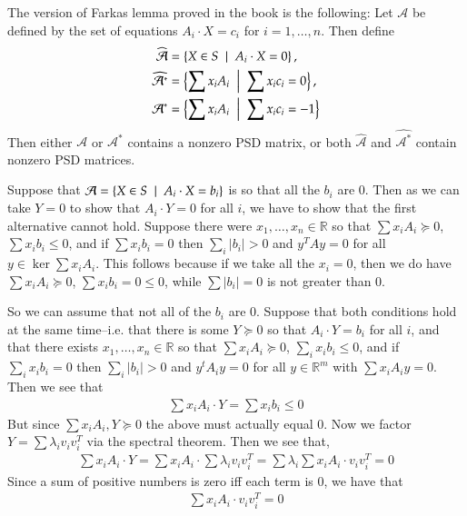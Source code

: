 \documentclass[12pt]{article}
\theoremstyle{definitionstyle}
\def\mbb#1{\mathbb{#1}}
\def\R{\mbb{R}}
\newcommand{\SET}[1]{\Set{\mskip-\medmuskip #1 \mskip-\medmuskip}}
\begin{document}
    The version of Farkas lemma proved in the book is the following:
    Let $\mathcal A$ be defined by the set of equations $A_i \cdot X = c_i$ for $i = 1,\ldots,n$. Then define
    \begin{align*}
        \widehat{\mathcal A} &= \SET{X \in S \; | \; A_i \cdot X = 0}, \\
        \widehat{\mathcal A^*} &= \SET{\sum x_iA_i \; | \; \sum x_ic_i = 0}, \\
        \mathcal A^* &= \SET{\sum x_iA_i \; | \; \sum x_ic_i = -1}
    \end{align*}
    Then either $\mathcal A$ or $\mathcal A^*$ contains a nonzero PSD matrix, or both $\widehat{\mathcal A}$ and $\widehat{\mathcal A^*}$ contain nonzero PSD matrices.

    Suppose that $\mathcal{A} = \SET{X \in S \; | \; A_i \cdot X = b_i}$ is so that all the $b_i$ are 0. Then as we can take $Y=0$ to show that $A_i \cdot Y = 0$ for all $i$, we have to show that the first alternative cannot hold. Suppose there were $x_1, \ldots, x_n \in \R$ so that $\sum x_i A_i \succeq 0$, $\sum x_ib_i \leq 0$, and if $\sum x_ib_i = 0$ then $\sum_i |b_i| > 0$ and $y^TAy = 0$ for all $y \in \ker \sum x_iA_i$. This follows because if we take all the $x_i = 0$, then we do have $\sum x_iA_i \succeq 0$, $\sum x_ib_i = 0 \leq 0$, while $\sum |b_i| = 0$ is not greater than 0. 
    
    So we can assume that not all of the $b_i$ are 0. Suppose that both conditions hold at the same time--i.e. that there is some $Y \succeq 0$ so that $A_i \cdot Y = b_i$ for all $i$, and that there exists $x_1, \ldots, x_n \in \R$ so that $\sum x_iA_i \succeq 0$, $\sum_i x_ib_i \leq 0$, and if $\sum_i x_ib_i = 0$ then $\sum_i |b_i| > 0$ and $y^tA_iy = 0$ for all $y \in \R^m$ with $\sum x_iA_i y = 0$. Then we see that 
    \begin{align*}
        \sum x_iA_i \cdot Y = \sum x_ib_i \leq 0
    \end{align*}
    But since $\sum x_iA_i, Y \succeq 0$ the above must actually equal 0. Now we factor $Y = \sum \lambda_i v_iv_i^T$ via the spectral theorem. Then we see that,
    \begin{align*}
        \sum x_iA_i \cdot Y = \sum x_iA_i \cdot \sum \lambda_i v_iv_i^T = \sum \lambda_i \sum x_iA_i \cdot v_iv_i^T = 0
    \end{align*}
    Since a sum of positive numbers is zero iff each term is 0, we have that
    \begin{align*}
       \sum x_iA_i \cdot v_iv_i^T = 0
    \end{align*}
\end{document}
